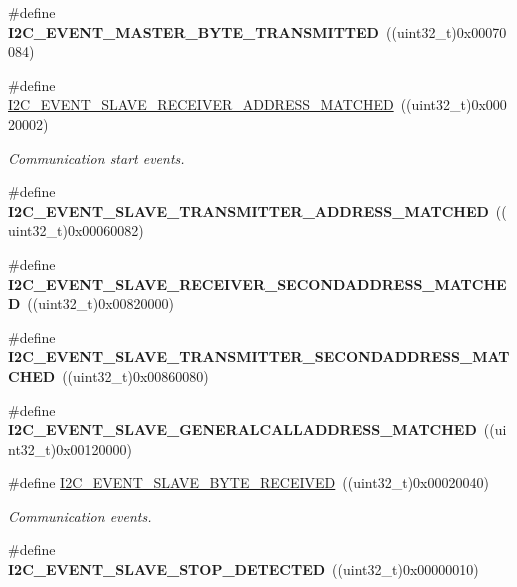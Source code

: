 \begin{DoxyCompactItemize}
\item 
\hypertarget{group__I2C__Events_ga8fe3b96b54e3c38e1de5d48536039c8f}{
\#define {\bfseries I2C\_\-EVENT\_\-MASTER\_\-BYTE\_\-TRANSMITTED}~((uint32\_\-t)0x00070084)}
\label{group__I2C__Events_ga8fe3b96b54e3c38e1de5d48536039c8f}

\item 
\#define \hyperlink{group__I2C__Events_ga6cf0e334704618b024eee604849f50f7}{I2C\_\-EVENT\_\-SLAVE\_\-RECEIVER\_\-ADDRESS\_\-MATCHED}~((uint32\_\-t)0x00020002)
\begin{DoxyCompactList}\small\item\em Communication start events. \item\end{DoxyCompactList}\item 
\hypertarget{group__I2C__Events_ga3fa381c1fd9a95c8ae13c6cc402b1327}{
\#define {\bfseries I2C\_\-EVENT\_\-SLAVE\_\-TRANSMITTER\_\-ADDRESS\_\-MATCHED}~((uint32\_\-t)0x00060082)}
\label{group__I2C__Events_ga3fa381c1fd9a95c8ae13c6cc402b1327}

\item 
\hypertarget{group__I2C__Events_ga17e78ab01fa980b3df10f8d9f6864c48}{
\#define {\bfseries I2C\_\-EVENT\_\-SLAVE\_\-RECEIVER\_\-SECONDADDRESS\_\-MATCHED}~((uint32\_\-t)0x00820000)}
\label{group__I2C__Events_ga17e78ab01fa980b3df10f8d9f6864c48}

\item 
\hypertarget{group__I2C__Events_ga6221aa204356bec9146f800ccfc99fc1}{
\#define {\bfseries I2C\_\-EVENT\_\-SLAVE\_\-TRANSMITTER\_\-SECONDADDRESS\_\-MATCHED}~((uint32\_\-t)0x00860080)}
\label{group__I2C__Events_ga6221aa204356bec9146f800ccfc99fc1}

\item 
\hypertarget{group__I2C__Events_ga15195f6def95f688ae9725899f49ea23}{
\#define {\bfseries I2C\_\-EVENT\_\-SLAVE\_\-GENERALCALLADDRESS\_\-MATCHED}~((uint32\_\-t)0x00120000)}
\label{group__I2C__Events_ga15195f6def95f688ae9725899f49ea23}

\item 
\#define \hyperlink{group__I2C__Events_ga8b244626839940569c6c8bbfc4efe21d}{I2C\_\-EVENT\_\-SLAVE\_\-BYTE\_\-RECEIVED}~((uint32\_\-t)0x00020040)
\begin{DoxyCompactList}\small\item\em Communication events. \item\end{DoxyCompactList}\item 
\hypertarget{group__I2C__Events_ga3148d8d7087e418959bc31e2646b2941}{
\#define {\bfseries I2C\_\-EVENT\_\-SLAVE\_\-STOP\_\-DETECTED}~((uint32\_\-t)0x00000010)}
\label{group__I2C__Events_ga3148d8d7087e418959bc31e2646b2941}


\end{DoxyCompactItemize}
